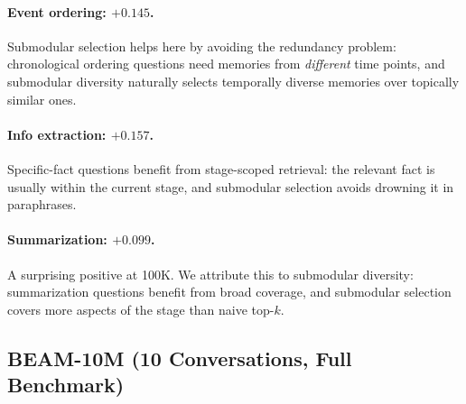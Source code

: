 \documentclass[11pt]{article}
\begin{document}
\paragraph{Event ordering: $+0.145$.}
Submodular selection helps here by avoiding the redundancy problem:
chronological ordering questions need memories from \emph{different}
time points, and submodular diversity naturally selects temporally
diverse memories over topically similar ones.

\paragraph{Info extraction: $+0.157$.}
Specific-fact questions benefit from stage-scoped retrieval: the
relevant fact is usually within the current stage, and submodular
selection avoids drowning it in paraphrases.

\paragraph{Summarization: $+0.099$.}
A surprising positive at 100K.  We attribute this to submodular
diversity: summarization questions benefit from broad coverage, and
submodular selection covers more aspects of the stage than naive
top-$k$.

\subsection{BEAM-10M (10 Conversations, Full Benchmark)}
\label{sec:results-10m}
\end{document}
